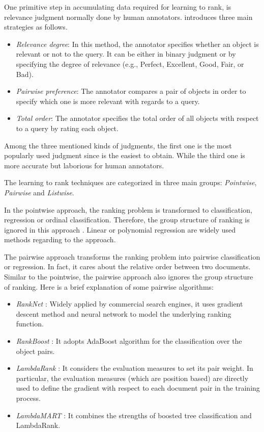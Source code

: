 One primitive step in accumulating data required for learning to rank, is relevance judgment normally done by human annotators. \cite{l2r-book} introduces three main strategies as follows.
\begin{itemize}
\item \textit{Relevance degree}: In this method, the annotator specifies whether an object is relevant or not to the query. It can be either in binary judgment or by specifying the degree of relevance (e.g., Perfect, Excellent, Good, Fair, or Bad).
\item \textit{Pairwise preference}: The annotator compares a pair of objects in order to specify which one is more relevant with regards to a query.
\item \textit{Total order}: The annotator specifies the total order of all objects with respect to a query by rating each object.
\end{itemize}

Among the three mentioned kinds of judgments, the first one is the most popularly used judgment since is the easiest to obtain. While the third one is more accurate but laborious for human annotators.

The learning to rank techniques are categorized in three main groups: \textit{Pointwise}, \textit{Pairwise} and \textit{Listwise}.

In the pointwise approach, the ranking problem is transformed to classification, regression or ordinal classification. Therefore, the group structure of ranking is ignored in this approach \cite{l2r-intro}. Linear or polynomial regression are widely used methods regarding to the approach.

The pairwise approach transforms the ranking problem into pairwise classification or regression. In fact, it cares about the relative order between two documents. Similar to the pointwise, the pairwise approach also ignores the group structure of ranking\cite{l2r-intro}. Here is a brief explanation of some pairwise algorithms:

\begin{itemize}
\item \textit{RankNet} \cite{l2r-ranknet}: Widely applied by commercial search engines, it uses gradient descent method and neural network to model the underlying ranking function.
\item \textit{RankBoost} \cite{l2r-rankboost}: It adopts AdaBoost algorithm for the classification over the object pairs.
\item \textit{LambdaRank} \cite{l2r-lambdarank}: It considers the evaluation measures to set its pair weight. In particular, the evaluation measures (which are position based) are directly used to define the gradient with respect to each document pair in the training process.
\item \textit{LambdaMART} \cite{l2r-lambdamart}: It combines the strengths of boosted tree classification and LambdaRank.
\end{itemize}

